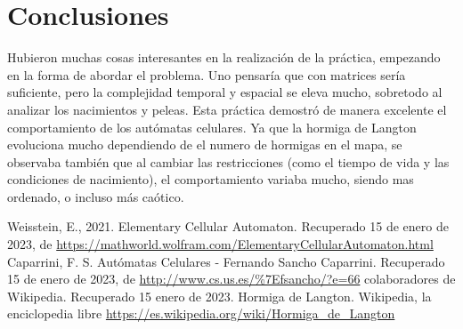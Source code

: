 \documentclass[10pt]{article}
\begin{document}
    \section{Conclusiones}
    Hubieron muchas cosas interesantes en la realización de la práctica, empezando en la forma de abordar el problema. Uno pensaría que con matrices sería suficiente, pero la complejidad temporal y espacial se eleva mucho, sobretodo al analizar los nacimientos y peleas. Esta práctica demostró de manera excelente el comportamiento de los autómatas celulares. Ya que la hormiga de Langton evoluciona mucho dependiendo de el numero de hormigas en el mapa, se observaba también que al cambiar las restricciones (como el tiempo de vida y las condiciones de nacimiento), el comportamiento variaba mucho, siendo mas ordenado, o incluso más caótico. 
    
    \begin{thebibliography}{1}
        Weisstein, E., 2021. Elementary Cellular Automaton. Recuperado 15 de enero de 2023, de \url{https://mathworld.wolfram.com/ElementaryCellularAutomaton.html}
         Caparrini, F. S. Autómatas Celulares - Fernando Sancho Caparrini. Recuperado 15 de enero de 2023, de \url{http://www.cs.us.es/%7Efsancho/?e=66}
         colaboradores de Wikipedia. Recuperado 15 enero de 2023. Hormiga de Langton. Wikipedia, la enciclopedia libre \url{https://es.wikipedia.org/wiki/Hormiga_de_Langton}
    \end{thebibliography}
    
\end{document}

